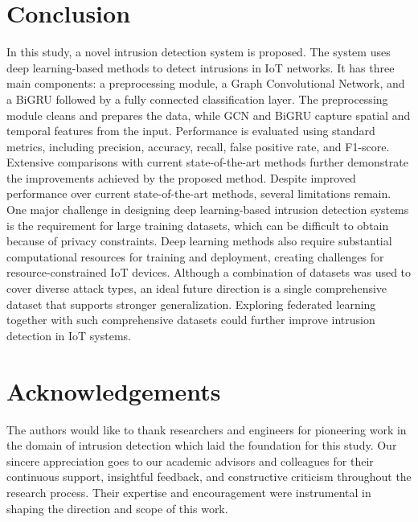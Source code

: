 \documentclass[a4paper,fleqn]{cas-sc}
\begin{document}
\section{Conclusion}\label{sec:conclusion}
In this study, a novel intrusion detection system is proposed. The system uses deep learning-based methods to detect intrusions in IoT networks. It has three main components: a preprocessing module, a Graph Convolutional Network, and a BiGRU followed by a fully connected classification layer. The preprocessing module cleans and prepares the data, while GCN and BiGRU capture spatial and temporal features from the input. Performance is evaluated using standard metrics, including precision, accuracy, recall, false positive rate, and F1-score. Extensive comparisons with current state-of-the-art methods further demonstrate the improvements achieved by the proposed method.
Despite improved performance over current state-of-the-art methods, several limitations remain. One major challenge in designing deep learning-based intrusion detection systems is the requirement for large training datasets, which can be difficult to obtain because of privacy constraints. Deep learning methods also require substantial computational resources for training and deployment, creating challenges for resource-constrained IoT devices. Although a combination of datasets was used to cover diverse attack types, an ideal future direction is a single comprehensive dataset that supports stronger generalization. Exploring federated learning together with such comprehensive datasets could further improve intrusion detection in IoT systems.

\section*{Acknowledgements}
The authors would like to thank researchers and engineers for pioneering work in the domain of intrusion detection which laid the foundation for this study. Our sincere appreciation goes to our academic advisors and colleagues for their continuous support, insightful feedback, and constructive criticism throughout the research process. Their expertise and encouragement were instrumental in shaping the direction and scope of this work.
\end{document}

